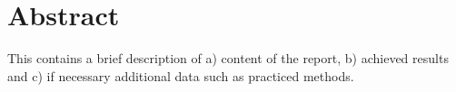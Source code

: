 \chapter{Abstract}

This contains a brief description of a) content of the report, b) achieved results and c) if necessary additional data such as practiced methods. 